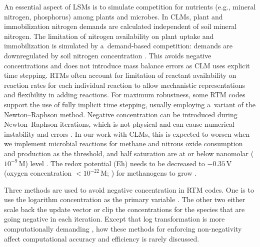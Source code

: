\documentclass[gmd,noline]{copernicus}
\begin{document}
      An essential aspect of LSMs is to simulate competition for nutrients
      (e.g., mineral nitrogen, phosphorus) among plants and microbes. In
      CLMs, plant and immobilization nitrogen demands are calculated
      independent of soil mineral nitrogen. The limitation of nitrogen
      availability on plant uptake and immobilization is simulated by
      a~demand-based competition: demands are downregulated by soil nitrogen
      concentration \citep{Oleson2013,Thornton2005}.  This avoids negative
      concentrations and does not introduce mass balance errors
      \citep{Tang2015} as CLM uses explicit time stepping.
\hack{\newpage}
      RTMs often account for limitation of reactant availability on reaction
      rates for each individual reaction to allow mechanistic
      representations and flexibility in adding reactions. For maximum
      robustness, some RTM codes support the use of fully implicit time
      stepping, usually employing a~variant of the Newton--Raphson
      method. Negative concentration can be introduced during
      Newton--Raphson iterations, which is not physical and can cause
      numerical instability and errors \citep{Shampine2005}. In our work
      with CLMs, this is expected to worsen when we implement microbial
      reactions for methane and nitrous oxide consumption and production as
      the threshold, and half saturation are at or below nanomolar
      ($10^{-9}$\,\unit{M}) level \citep{Conrad1996}. The redox potential
      (Eh)
      needs to be decreased to $-0.35$\,\unit{V} (oxygen concentration
      $<10^{-22}$\,\unit{M}; \citealp{Hungate1975}) for methanogens to grow
      \citep{Jarrell1985}.

      Three methods are used to avoid negative concentration in RTM
      codes. One is to use the logarithm concentration as the primary
      variable \citep{Bethke2007,Hammond2003,Parkhurst1999}. The other two
      either scale back the update vector \citep{Bethke2007,Hammond2003} or
      clip the concentrations for the species that are going negative
      \citep{Yeh2004,White2005,Xu2014} in each iteration. Except that log
      transformation is more computationally demanding \citep{Hammond2003},
      how these methods for enforcing non-negativity affect computational
      accuracy and efficiency is rarely discussed.
\end{document}
